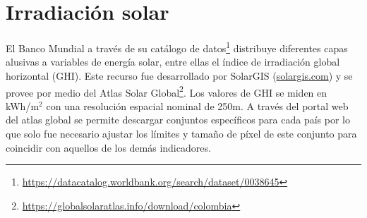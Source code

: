 \section{Irradiación solar}

El Banco Mundial a través de su catálogo de datos\footnote{\url{https://datacatalog.worldbank.org/search/dataset/0038645}} distribuye diferentes capas alusivas 
a variables de energía solar, entre ellas el índice de irradiación global horizontal (GHI).  Este recurso fue desarrollado por SolarGIS 
(\href{https://solargis.com}{solargis.com}) y se provee por medio del Atlas Solar Global\footnote{\url{https://globalsolaratlas.info/download/colombia}}.  Los 
valores de GHI se miden en kWh/m$^2$ con una resolución espacial nominal de 250m.  A través del portal web del atlas global se permite descargar conjuntos 
específicos para cada país por lo que solo fue necesario ajustar los límites y tamaño de píxel de este conjunto para coincidir con aquellos de los demás 
indicadores.
